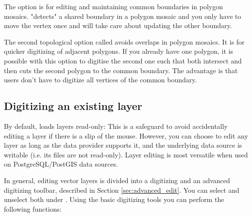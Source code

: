 
The option  is for editing and maintaining
common boundaries in polygon mosaics. \qg "detects" a shared boundary in
a polygon mosaic and you only have to move the vertex once and \qg will take
care about updating the other boundary.


The second topological option called 
avoids overlaps in polygon mosaics. It is for quicker digitizing of adjacent polygons.
If you already have one polygon, it is possible with this option to digitise the second
one such that both intersect and \qg then cuts the second polygon to the common boundary.
The advantage is that users don't have to digitize all vertices of the common boundary.

\subsection{Digitizing an existing layer}
\label{sec:edit_existing_layer}

By default, \qg loads layers read-only: This is a safeguard
to avoid accidentally editing a layer if there is a slip of the mouse.
However, you can choose to edit any layer as long as the data provider
supports it, and the underlying data source is writable (i.e. its files are
not read-only). Layer editing is most versatile when used on
PostgreSQL/PostGIS data sources.

In general, editing vector layers is divided into a digitizing and an advanced
digitizing toolbar, described in Section \ref{sec:advanced_edit}. You can
select and unselect both under  \arrow {}.
Using the basic digitizing tools you can perform the following functions:

